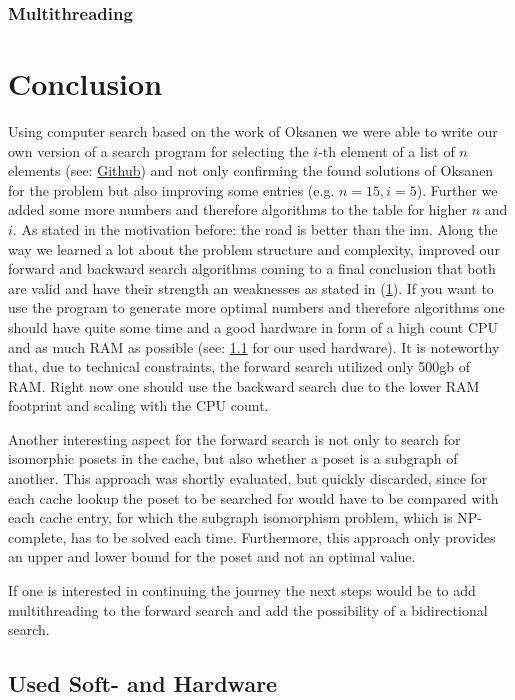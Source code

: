 \documentclass[10pt,journal,compsoc]{IEEEtran}
\begin{document}
\subsubsection{Multithreading}


\section{Conclusion}
Using computer search based on the work of Oksanen we were able to write our own version of a search program for selecting the $i$-th element of a list of $n$ elements (see: \href{https://github.com/JGDoerrer/selection_generator}{Github}) and not only confirming the found solutions of Oksanen for the problem but also improving some entries (e.g. $n = 15, i = 5$).
Further we added some more numbers and therefore algorithms to the table for higher $n$ and $i$.
As stated in the motivation before: the road is better than the inn.
Along the way we learned a lot about the problem structure and complexity, improved our forward and backward search algorithms coming to a final conclusion that both are valid and have their strength an weaknesses as stated in (\ref{}).
If you want to use the program to generate more optimal numbers and therefore algorithms one should have quite some time and a good hardware in form of a high count CPU and as much RAM as possible (see: \ref{sec:hardware} for our used hardware).
It is noteworthy that, due to technical constraints, the forward search utilized only 500gb of RAM. %
Right now one should use the backward search due to the lower RAM footprint and scaling with the CPU count.

Another interesting aspect for the forward search is not only to search for isomorphic posets in the cache, but also whether a poset is a subgraph of another.
This approach was shortly evaluated, but quickly discarded, since for each cache lookup the poset to be searched for would have to be compared with each cache entry, for which the subgraph isomorphism problem, which is NP-complete, has to be solved each time.
Furthermore, this approach only provides an upper and lower bound for the poset and not an optimal value.

If one is interested in continuing the journey the next steps would be to add multithreading to the forward search and add the possibility of a
bidirectional search.


\subsection{Used Soft- and Hardware} \label{sec:hardware}
\end{document}
